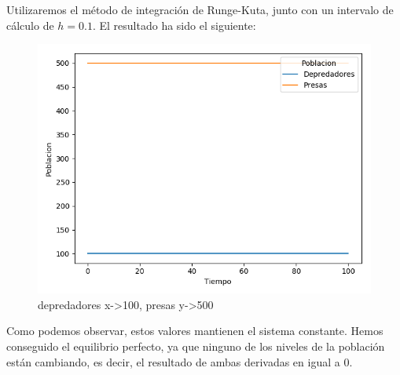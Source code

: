 \documentclass[11pt,a4paper]{article}
\begin{document}
Utilizaremos el método de integración de Runge-Kuta, junto con un intervalo de cálculo de $h=0.1$. El resultado ha sido el siguiente:
\begin{figure}[H]
\centering
\includegraphics[scale=0.65]{img/2-100-500.png}
\caption{depredadores x->100,   presas y->500}
\end{figure}

Como podemos observar, estos valores mantienen el sistema constante. Hemos conseguido el equilibrio perfecto, ya que ninguno de los niveles
de la población están cambiando, es decir, el resultado de ambas derivadas en igual a 0.
\end{document}
